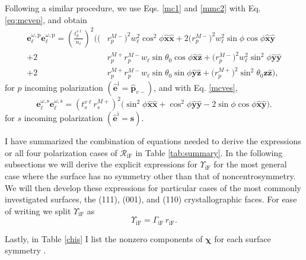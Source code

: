Following a similar procedure, we use Eqs. \eqref{mc1} and \eqref{mmc2} with Eq.
\eqref{eq:mcvep}, and obtain
\begin{equation}\label{eq:ewewpmr}
\begin{split}
\mathbf{e}^{\omega,\mathrm{p}}_{\ell}\mathbf{e}^{\omega,\mathrm{p}}_{\ell} =
\left(\frac{t^{v\ell}_{p}}{n_{\ell}}\right)^{2}
\bigg(
  \big(&r^{M-}_{p}\big)^{2}w^{2}_{\ell}\cos^{2}\phi
  \hat{\mathbf{x}}\hat{\mathbf{x}}
+ 2\big(r^{M-}_{p}\big)^{2}w^{2}_{\ell}\sin\phi\cos\phi
  \hat{\mathbf{x}}\hat{\mathbf{y}}\\
+ 2&r^{M+}_{p}r^{M-}_{p}w_{\ell}\sin\theta_{0}\cos\phi
  \hat{\mathbf{x}}\hat{\mathbf{z}}
+ \big(r^{M-}_{p}\big)^{2}w^{2}_{\ell}\sin^{2}\phi
  \hat{\mathbf{y}}\hat{\mathbf{y}}\\
+ 2&r^{M+}_{p}r^{M-}_{p}w_{\ell}\sin\theta_{0}\sin\phi
  \hat{\mathbf{y}}\hat{\mathbf{z}}
+ \big(r^{M+}_{p}\big)^{2}\sin^{2}\theta_{0}
   \hat{\mathbf{z}}\hat{\mathbf{z}}
\bigg),
\end{split}
\end{equation}
for $p$ incoming polarization $(\hat{\mathbf{e}}^{\mathrm{i}} =
\hat{\mathbf{p}}_{v-})$, and with Eq. \eqref{mcves},
\begin{equation}\label{eq:ewewsmr}
\mathbf{e}^{\omega,\mathrm{s}}_{\ell}\mathbf{e}^{\omega,\mathrm{s}}_{\ell}
= \left(t^{v\ell}_{s}r^{M+}_{s}\right)^{2}
\big(
  \sin^{2}\phi\hat{\mathbf{x}}\hat{\mathbf{x}}
 + \cos^{2}\phi\hat{\mathbf{y}}\hat{\mathbf{y}}
 - 2\sin\phi\cos\phi\hat{\mathbf{x}}\hat{\mathbf{y}}
\big).
\end{equation}
for $s$ incoming polarization $(\hat{\mathbf{e}}^{\mathrm{i}} =
\hat{\mathbf{s}})$.

I have summarized the combination of equations needed to derive the expressions
or all four polarization cases of $\mathcal{R}_{\mathrm{iF}}$ in Table
\ref{tab:summary}. In the following subsections we will derive the explicit
expressions for $\Upsilon_{\mathrm{iF}}$ for the most general case where the
surface has no symmetry other than that of noncentrosymmetry. We will then
develop these expressions for particular cases of the most commonly investigated
surfaces, the (111), (001), and (110) crystallographic faces. For ease of
writing we split $\Upsilon_{\mathrm{iF}}$ as
\begin{equation}\label{eq:mc25}
\Upsilon_{\mathrm{iF}} = \Gamma_{\mathrm{iF}}\,r_{\mathrm{iF}}.
\end{equation} 

Lastly, in Table \ref{chis} I list the nonzero components of $\boldsymbol{\chi}$
for each surface symmetry \cite{sipePRB87, popovbook}.

